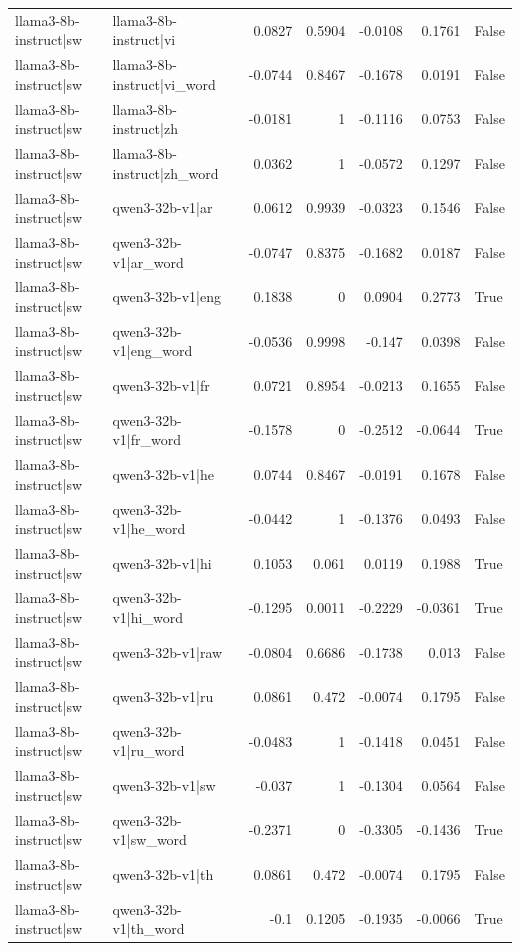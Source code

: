 \begin{table}
\begin{tabular}{l l r r r r l}
llama3-8b-instruct|sw & llama3-8b-instruct|vi & 0.0827 & 0.5904 & -0.0108 & 0.1761 & False \\
llama3-8b-instruct|sw & llama3-8b-instruct|vi_word & -0.0744 & 0.8467 & -0.1678 & 0.0191 & False \\
llama3-8b-instruct|sw & llama3-8b-instruct|zh & -0.0181 & 1 & -0.1116 & 0.0753 & False \\
llama3-8b-instruct|sw & llama3-8b-instruct|zh_word & 0.0362 & 1 & -0.0572 & 0.1297 & False \\
llama3-8b-instruct|sw & qwen3-32b-v1|ar & 0.0612 & 0.9939 & -0.0323 & 0.1546 & False \\
llama3-8b-instruct|sw & qwen3-32b-v1|ar_word & -0.0747 & 0.8375 & -0.1682 & 0.0187 & False \\
llama3-8b-instruct|sw & qwen3-32b-v1|eng & 0.1838 & 0 & 0.0904 & 0.2773 & True \\
llama3-8b-instruct|sw & qwen3-32b-v1|eng_word & -0.0536 & 0.9998 & -0.147 & 0.0398 & False \\
llama3-8b-instruct|sw & qwen3-32b-v1|fr & 0.0721 & 0.8954 & -0.0213 & 0.1655 & False \\
llama3-8b-instruct|sw & qwen3-32b-v1|fr_word & -0.1578 & 0 & -0.2512 & -0.0644 & True \\
llama3-8b-instruct|sw & qwen3-32b-v1|he & 0.0744 & 0.8467 & -0.0191 & 0.1678 & False \\
llama3-8b-instruct|sw & qwen3-32b-v1|he_word & -0.0442 & 1 & -0.1376 & 0.0493 & False \\
llama3-8b-instruct|sw & qwen3-32b-v1|hi & 0.1053 & 0.061 & 0.0119 & 0.1988 & True \\
llama3-8b-instruct|sw & qwen3-32b-v1|hi_word & -0.1295 & 0.0011 & -0.2229 & -0.0361 & True \\
llama3-8b-instruct|sw & qwen3-32b-v1|raw & -0.0804 & 0.6686 & -0.1738 & 0.013 & False \\
llama3-8b-instruct|sw & qwen3-32b-v1|ru & 0.0861 & 0.472 & -0.0074 & 0.1795 & False \\
llama3-8b-instruct|sw & qwen3-32b-v1|ru_word & -0.0483 & 1 & -0.1418 & 0.0451 & False \\
llama3-8b-instruct|sw & qwen3-32b-v1|sw & -0.037 & 1 & -0.1304 & 0.0564 & False \\
llama3-8b-instruct|sw & qwen3-32b-v1|sw_word & -0.2371 & 0 & -0.3305 & -0.1436 & True \\
llama3-8b-instruct|sw & qwen3-32b-v1|th & 0.0861 & 0.472 & -0.0074 & 0.1795 & False \\
llama3-8b-instruct|sw & qwen3-32b-v1|th_word & -0.1 & 0.1205 & -0.1935 & -0.0066 & True \\

\end{tabular}
\end{table}
